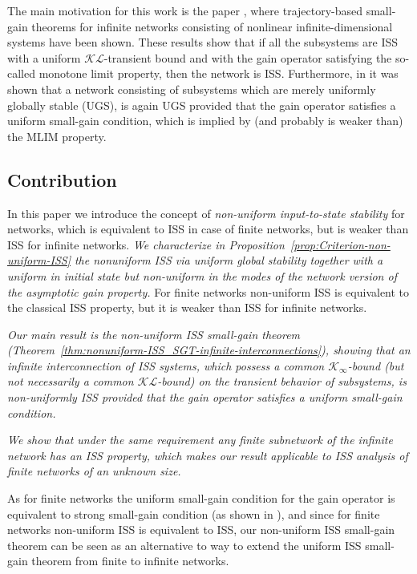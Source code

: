 \documentclass[twocolumn]{IEEEtran} %
\theoremstyle{definition}
\newcommand{\Kinf}{\mathcal{K_\infty}}%
\newcommand{\KL}{\mathcal{KL}}%
\begin{document}
The main motivation for this work is the paper \cite{MKG20}, where trajectory-based small-gain theorems for infinite networks consisting of nonlinear infinite-dimensional systems have been shown. These results show that if all the subsystems 
are ISS with a uniform $\KL$-transient bound and with the gain operator satisfying the  so-called monotone limit property, then the network is ISS. 
Furthermore, in \cite{MKG20} it was shown that a network consisting of subsystems which are merely uniformly globally stable (UGS), is again UGS provided that the gain operator satisfies a uniform small-gain condition, which is implied by (and probably is weaker than) the MLIM property.



\subsection{Contribution}

In this paper we introduce the concept of \emph{non-uniform input-to-state stability} for networks, which is equivalent to ISS in case of finite networks, but is weaker than ISS  for infinite networks.
\emph{We characterize in Proposition~\ref{prop:Criterion-non-uniform-ISS} the nonuniform ISS via uniform global stability together with a uniform in initial state but non-uniform in the modes of the network version of the asymptotic gain property.}
For finite networks non-uniform ISS is equivalent to the classical ISS property, but it is weaker than ISS for infinite networks.

\emph{Our main result is the non-uniform ISS small-gain theorem (Theorem~\ref{thm:nonuniform-ISS_SGT-infinite-interconnections}), showing that an infinite interconnection of ISS systems, which possess a common $\Kinf$-bound (but not necessarily a common $\KL$-bound) on the transient behavior of subsystems, is non-uniformly ISS provided that the gain operator satisfies a uniform small-gain condition.}

\emph{We show that under the same requirement any finite subnetwork of the infinite network has an ISS property, which makes our result applicable to ISS analysis of finite networks of an unknown size.}

As for finite networks the uniform small-gain condition for the gain operator is equivalent to strong small-gain condition (as shown in \cite{MKG20}), and since  
for finite networks non-uniform ISS is equivalent to ISS, our non-uniform ISS small-gain theorem can be seen as an alternative to \cite{MKG20} way to extend the uniform ISS small-gain theorem from finite to infinite networks.
\end{document}
